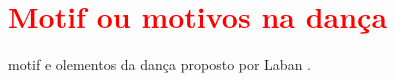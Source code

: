 \section{\textcolor{red}{Motif ou motivos na dança }}

motif e olementos da dança proposto por Laban \cite[pp. 46]{paine2014complete}.

